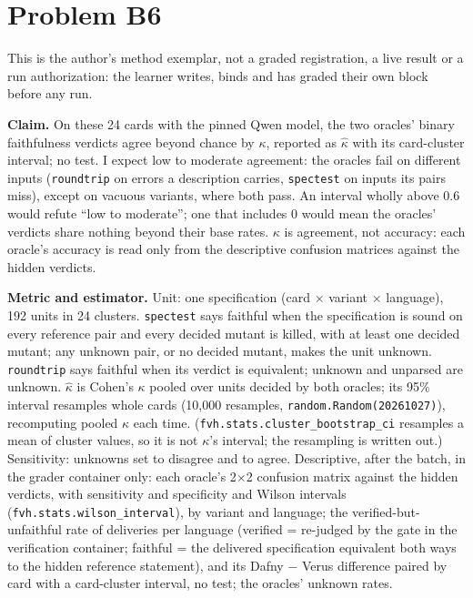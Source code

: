 \documentclass[11pt]{article}
\begin{document}
\section*{Problem B6}\label{ans:B6}
\begin{answer}
This is the author's method exemplar, not a graded registration, a live
result or a run authorization: the learner writes, binds and has graded their
own block before any run.

\textbf{Claim.} On these 24 cards with the pinned Qwen model, the two oracles'
binary faithfulness verdicts agree beyond chance by $\kappa$, reported as
$\hat\kappa$ with its card-cluster interval; no test. I expect low to moderate
agreement: the oracles fail on different inputs (\texttt{roundtrip} on errors a
description carries, \texttt{spectest} on inputs its pairs miss), except on
vacuous variants, where both pass. An interval wholly above 0.6 would refute
``low to moderate''; one that includes 0 would mean the oracles' verdicts
share nothing beyond their base rates. $\kappa$ is agreement, not accuracy:
each oracle's accuracy is read only from the descriptive confusion matrices
against the hidden verdicts.

\textbf{Metric and estimator.} Unit: one specification (card $\times$ variant
$\times$ language), 192 units in 24 clusters. \texttt{spectest} says faithful
when the specification is sound on every reference pair and every decided
mutant is killed, with at least one decided mutant; any unknown pair, or no
decided mutant, makes the unit unknown. \texttt{roundtrip} says faithful when
its verdict is equivalent; unknown and unparsed are unknown. $\hat\kappa$ is
Cohen's $\kappa$ pooled over units decided by both oracles; its 95\% interval
resamples whole cards (10,000 resamples, \texttt{random.Random(20261027)}),
recomputing pooled $\kappa$ each time. (\texttt{fvh.stats.cluster\_bootstrap\_ci}
resamples a mean of cluster values, so it is not $\kappa$'s interval; the
resampling is written out.) Sensitivity: unknowns set to disagree and to
agree. Descriptive, after the batch, in the grader container only: each
oracle's 2$\times$2 confusion matrix against the hidden verdicts, with
sensitivity and specificity and Wilson intervals (\texttt{fvh.stats.wilson\_interval}),
by variant and language; the verified-but-unfaithful rate of deliveries per
language (verified = re-judged by the gate in the verification container;
faithful = the delivered specification equivalent both ways to the hidden
reference statement), and its Dafny $-$ Verus difference paired by card with a
card-cluster interval, no test; the oracles' unknown rates.


\end{answer}
\end{document}
